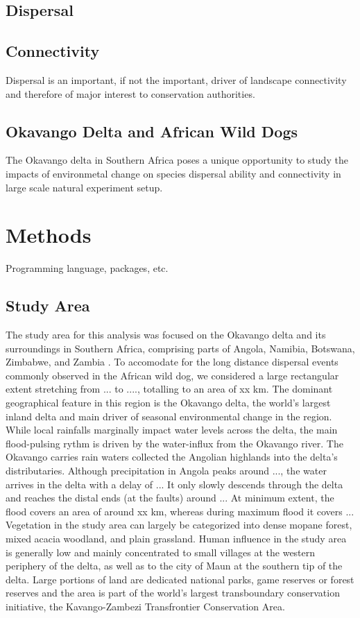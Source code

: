 \documentclass[abstract=on,10pt,a4paper,bibliography=totocnumbered]{article}
\begin{document}
\subsection{Dispersal}
\subsection{Connectivity}
Dispersal is an important, if not the important, driver of landscape
connectivity and therefore of major interest to conservation authorities.

\subsection{Okavango Delta and African Wild Dogs}
The Okavango delta in Southern Africa poses a unique opportunity to study the
impacts of environmetal change on species dispersal ability and connectivity in
large scale natural experiment setup.


\section{Methods}
Programming language, packages, etc.

\subsection{Study Area}
The study area for this analysis was focused on the Okavango delta and its
surroundings in Southern Africa, comprising parts of Angola, Namibia, Botswana,
Zimbabwe, and Zambia . To accomodate for the long distance
dispersal events commonly observed in the African wild dog, we considered a
large rectangular extent stretching from ... to ...., totalling to an area of xx
km. The dominant geographical feature in this region is the Okavango delta, the
world's largest inland delta and main driver of seasonal environmental change in
the region. While local rainfalls marginally impact water levels across the
delta, the main flood-pulsing rythm is driven by the water-influx from the
Okavango river. The Okavango carries rain waters collected the Angolian
highlands into the delta's distributaries. Although precipitation in Angola
peaks around ..., the water arrives in the delta with a delay of ... It only
slowly descends through the delta and reaches the distal ends (at the faults)
around ... At minimum extent, the flood covers an area of around xx km, whereas
during maximum flood it covers ... Vegetation in the study area can largely be
categorized into dense mopane forest, mixed acacia woodland, and plain
grassland. Human influence in the study area is generally low and mainly
concentrated to small villages at the western periphery of the delta, as well as
to the city of Maun at the southern tip of the delta. Large portions of land are
dedicated national parks, game reserves or forest reserves and the area is part
of the world's largest transboundary conservation initiative, the
Kavango-Zambezi Transfrontier Conservation Area.
\end{document}
